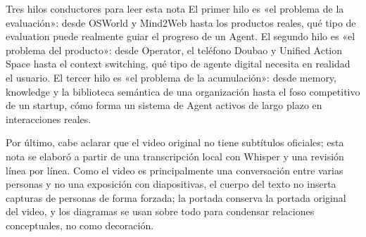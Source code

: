 \begin{importantbox}{Tres hilos conductores para leer esta nota}
El primer hilo es «el problema de la evaluación»: desde OSWorld y Mind2Web hasta los productos reales, qué tipo de evaluation puede realmente guiar el progreso de un Agent. El segundo hilo es «el problema del producto»: desde Operator, el teléfono Doubao y Unified Action Space hasta el context switching, qué tipo de agente digital necesita en realidad el usuario. El tercer hilo es «el problema de la acumulación»: desde memory, knowledge y la biblioteca semántica de una organización hasta el foso competitivo de un startup, cómo forma un sistema de Agent activos de largo plazo en interacciones reales.
\end{importantbox}

Por último, cabe aclarar que el video original no tiene subtítulos oficiales; esta nota se elaboró a partir de una transcripción local con Whisper y una revisión línea por línea. Como el video es principalmente una conversación entre varias personas y no una exposición con diapositivas, el cuerpo del texto no inserta capturas de personas de forma forzada; la portada conserva la portada original del video, y los diagramas se usan sobre todo para condensar relaciones conceptuales, no como decoración.
